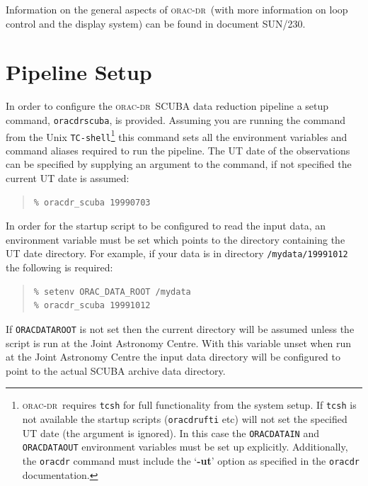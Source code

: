 \documentclass[twoside,11pt]{article}
\newcommand{\xref}[3]{#1}
\newcommand{\xlabel}[1]{}
\renewcommand{\_}{\texttt{\symbol{95}}}
\newcommand{\oracdr}{\xref{\textsc{orac-dr}}{sun230}{}}
\newcommand{\oracsun}{\xref{SUN/230}{sun230}{}}
\newenvironment{myquote}{\begin{quote}\begin{small}}{\end{small}\end{quote}}
\begin{document}
Information on the general aspects of \oracdr\ (with more information on loop
control and the display system) can be found in document \oracsun.




\section{Pipeline Setup\xlabel{pipeline_setup}}

In order to configure the \oracdr\ SCUBA data reduction pipeline a setup
command, \texttt{oracdr\_scuba}, is provided. Assuming you are running the
command from the Unix \texttt{TC-shell}\footnote{\oracdr\ requires
\texttt{tcsh} for full functionality from the system setup. If \texttt{tcsh}
is not available the startup scripts (\texttt{oracdr\_ufti} etc) will not set
the specified UT date (the argument is ignored). In this case the
\texttt{ORAC\_DATA\_IN} and \texttt{ORAC\_DATA\_OUT} environment variables
must be set up explicitly.  Additionally, the \texttt{oracdr} command must
include the `\textbf{-ut}' option as specified in the \texttt{oracdr}
documentation.} this command sets all the environment variables and command
aliases required to run the pipeline.  The UT date of the observations can be
specified by supplying an argument to the command, if not specified the
current UT date is assumed:

\begin{myquote}
\begin{verbatim}
% oracdr_scuba 19990703
\end{verbatim}
\end{myquote}

In order for the startup script to be configured to read the
input data, an environment variable must be set which points
to the directory containing the UT date directory. For example,
if your data is in directory \texttt{/mydata/19991012} the following
is required:

\begin{myquote}
\begin{verbatim}
% setenv ORAC_DATA_ROOT /mydata
% oracdr_scuba 19991012
\end{verbatim}
\end{myquote}

If \texttt{ORAC\_DATA\_ROOT} is not set then the current directory
will be assumed unless the script is run at the Joint Astronomy Centre.
With this variable unset when run at the Joint Astronomy Centre
the input data directory will be configured to point to the actual
SCUBA archive data directory.
\end{document}
